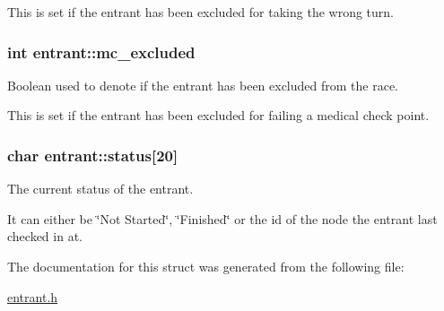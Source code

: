 This is set if the entrant has been excluded for taking the wrong turn. \hypertarget{structentrant_a8a2f95c38b025e9bad015b2dfab113b5}{
\subsubsection[{mc\-\_\-excluded}]{\setlength{\rightskip}{0pt plus 5cm}int entrant\-::mc\-\_\-excluded}}\label{structentrant_a8a2f95c38b025e9bad015b2dfab113b5}


Boolean used to denote if the entrant has been excluded from the race. 

This is set if the entrant has been excluded for failing a medical check point. \hypertarget{structentrant_a37176427e9cc8045ff719ddc71073e16}{
\subsubsection[{status}]{\setlength{\rightskip}{0pt plus 5cm}char entrant\-::status\mbox{[}20\mbox{]}}}\label{structentrant_a37176427e9cc8045ff719ddc71073e16}


The current status of the entrant. 

It can either be \char`\"{}\-Not Started\char`\"{}, \char`\"{}\-Finished\char`\"{} or the id of the node the entrant last checked in at. 

The documentation for this struct was generated from the following file\-:\begin{DoxyCompactItemize}
\item 
\hyperlink{entrant_8h}{entrant.\-h}\end{DoxyCompactItemize}
